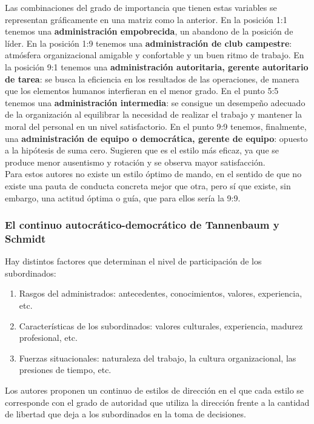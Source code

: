 \documentclass[12pt]{article}
\theoremstyle{definition_wo_parentheses}
\begin{document}
Las combinaciones del grado de importancia que tienen estas variables se representan gráficamente en una matriz como la anterior. En la posición 1:1 tenemos una \textbf{administración empobrecida}, un abandono de la posición de líder. En la posición 1:9 tenemos una \textbf{administración de club campestre}: atmósfera organizacional amigable y confortable y un buen ritmo de trabajo. En la posición 9:1 tenemos una \textbf{administración autoritaria, gerente autoritario de tarea}: se busca la eficiencia en los resultados de las operaciones, de manera que los elementos humanos interfieran en el menor grado. En el punto 5:5 tenemos una \textbf{administración intermedia}: se consigue un desempeño adecuado de la organización al equilibrar la necesidad de realizar el trabajo y mantener la moral del personal en un nivel satisfactorio. En el punto 9:9 tenemos, finalmente, una \textbf{administración de equipo o democrática, gerente de equipo}: opuesto a la hipótesis de suma cero. Sugieren que es el estilo más eficaz, ya que se produce menor ausentismo y rotación y se observa mayor satisfacción.\\

Para estos autores no existe un estilo óptimo de mando, en el sentido de que no existe una pauta de conducta concreta mejor que otra, pero sí que existe, sin embargo, una actitud óptima o guía, que para ellos sería la 9:9.

\subsubsection{El continuo autocrático-democrático de Tannenbaum y Schmidt}
Hay distintos factores que determinan el nivel de participación de los subordinados:
\begin{enumerate}
\item Rasgos del administrados: antecedentes, conocimientos, valores, experiencia, etc.
\item Características de los subordinados: valores culturales, experiencia, madurez profesional, etc.
\item Fuerzas situacionales: naturaleza del trabajo, la cultura organizacional, las presiones de tiempo, etc.
\end{enumerate}

Los autores proponen un continuo de estilos de dirección en el que cada estilo se corresponde con el grado de autoridad que utiliza la dirección frente a la cantidad de libertad que deja a los subordinados en la toma de decisiones.
\end{document}
